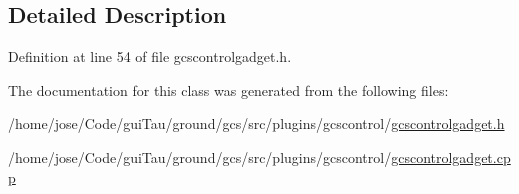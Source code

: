 \subsection{Detailed Description}


Definition at line 54 of file gcscontrolgadget.\-h.



The documentation for this class was generated from the following files\-:\begin{DoxyCompactItemize}
\item 
/home/jose/\-Code/gui\-Tau/ground/gcs/src/plugins/gcscontrol/\hyperlink{gcscontrolgadget_8h}{gcscontrolgadget.\-h}\item 
/home/jose/\-Code/gui\-Tau/ground/gcs/src/plugins/gcscontrol/\hyperlink{gcscontrolgadget_8cpp}{gcscontrolgadget.\-cpp}\end{DoxyCompactItemize}
